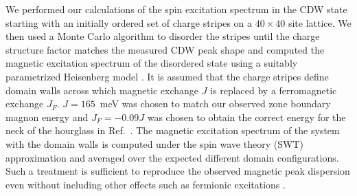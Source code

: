 \documentclass[9pt,twocolumn,twoside]{pnas-new}
\begin{document}
{\noindent We performed our calculations of the spin excitation spectrum in the CDW state starting with an initially ordered set of charge stripes on a $40 \times 40$ site lattice. We then used a Monte Carlo algorithm to disorder the stripes until the charge structure factor matches the measured CDW peak shape and computed the magnetic excitation spectrum of the disordered state using a suitably parametrized Heisenberg model \cite{Carlson2004}. It is assumed that the charge stripes define domain walls across which magnetic exchange $J$ is replaced by a ferromagnetic exchange $J_F$. $J=165$~meV was chosen to match our observed zone boundary magnon energy and $J_{F}=-0.09J$ was chosen to obtain the correct energy for the neck of the hourglass in Ref.~\cite{Tranquada2008}. The magnetic excitation spectrum of the system with the domain walls is computed under the spin wave theory (SWT) approximation and averaged over the expected different domain configurations. Such a treatment is sufficient to reproduce the observed magnetic peak dispersion even without including other effects such as fermionic excitations \cite{Seibold2006, Vojta2009}.

}

\showmatmethods{}


\showacknow{} 

\end{document}
